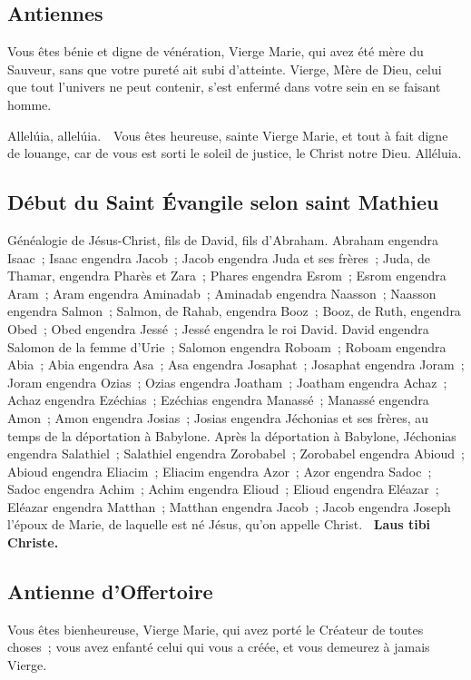 \begin{multicols}{2}
\subsection*{Antiennes}
Vous êtes bénie et digne de vénération, Vierge Marie, qui avez été mère du Sauveur, sans que votre pureté ait subi d’atteinte.
\vb Vierge, Mère de Dieu, celui que tout l’univers ne peut contenir, s’est enfermé dans votre sein en se faisant homme.

Allelúia, allelúia. \vb\ Vous êtes heureuse, sainte Vierge Marie, et tout à fait digne de louange, car de vous est sorti le soleil de justice, le Christ notre Dieu. Alléluia.

\subsection*{Début du Saint Évangile selon saint Mathieu}
Généalogie de Jésus-Christ, fils de David, fils d’Abraham. Abraham engendra Isaac ; Isaac engendra Jacob ; Jacob engendra Juda et ses frères ; Juda, de Thamar, engendra Pharès et Zara ; Phares engendra Esrom ; Esrom engendra Aram ; Aram engendra Aminadab ; Aminadab engendra Naasson ; Naasson engendra Salmon ; Salmon, de Rahab, engendra Booz ; Booz, de Ruth, engendra Obed ; Obed engendra Jessé ; Jessé engendra le roi David. David engendra Salomon de la femme d’Urie ; Salomon engendra Roboam ; Roboam engendra Abia ; Abia engendra Asa ; Asa engendra Josaphat ; Josaphat engendra Joram ; Joram engendra Ozias ; Ozias engendra Joatham ; Joatham engendra Achaz ; Achaz engendra Ezéchias ; Ezéchias engendra Manassé ; Manassé engendra Amon ; Amon engendra Josias ; Josias engendra Jéchonias et ses frères, au temps de la déportation à Babylone. Après la déportation à Babylone, Jéchonias engendra Salathiel ; Salathiel engendra Zorobabel ; Zorobabel engendra Abioud ; Abioud engendra Eliacim ; Eliacim engendra Azor ; Azor engendra Sadoc ; Sadoc engendra Achim ; Achim engendra Elioud ; Elioud engendra Eléazar ; Eléazar engendra Matthan ; Matthan engendra Jacob ; Jacob engendra Joseph l’époux de Marie, de laquelle est né Jésus, qu’on appelle Christ.
\textbf{ \rb\ Laus tibi Christe.}



\subsection*{Antienne d'Offertoire}
Vous êtes bienheureuse, Vierge Marie, qui avez porté le Créateur de toutes choses ; vous avez enfanté celui qui vous a créée, et vous demeurez à jamais Vierge.


\end{multicols}
